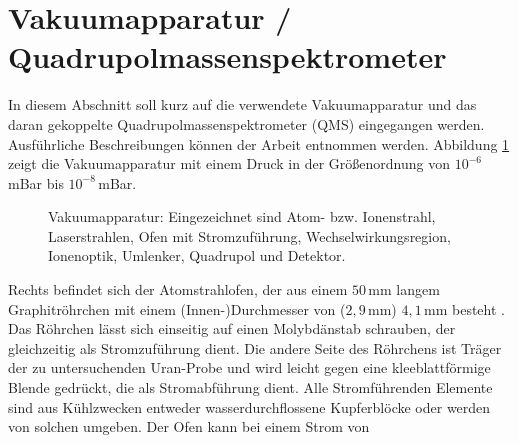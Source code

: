 \section{Vakuumapparatur /
Quadrupolmassenspektrometer}\label{sec:vakuumapparatur_qms}
In diesem Abschnitt soll kurz auf die verwendete Vakuumapparatur und das daran
gekoppelte Quadrupolmassenspektrometer (QMS) eingegangen werden. Ausführliche
Beschreibungen können der Arbeit \cite{blaum:1997:diplomarbeit} entnommen
werden. Abbildung \ref{fig:vakuumapparatur_foto} zeigt die Vakuumapparatur mit
einem Druck in der Größenordnung von $10^{-6}\,$mBar bis $10^{-8}\,$mBar.\par
\begin{figure}[h]
 	\centering
	\caption[Vakuumapparatur]{Vakuumapparatur: Eingezeichnet
	sind Atom- bzw. Ionenstrahl, Laserstrahlen,
	Ofen mit Stromzuführung, Wechselwirkungsregion, Ionenoptik, Umlenker,
	Quadrupol und Detektor.}\label{fig:vakuumapparatur_foto}
\end{figure}
Rechts befindet sich der Atomstrahlofen, der aus einem $50\,$mm langem
Graphitröhrchen mit einem (Innen-)Durchmesser von ($2,9\,$mm) $4,1\,$mm besteht \cite{raeder:2006:diplomarbeit}. Das Röhrchen lässt sich einseitig auf einen
Molybdänstab schrauben, der gleichzeitig als Stromzuführung dient. Die andere
Seite des Röhrchens ist Träger der zu untersuchenden Uran-Probe und wird leicht
gegen eine kleeblattförmige Blende gedrückt, die als Stromabführung dient. Alle
Stromführenden Elemente sind aus Kühlzwecken entweder wasserdurchflossene
Kupferblöcke oder werden von solchen umgeben. Der Ofen kann bei einem Strom von
